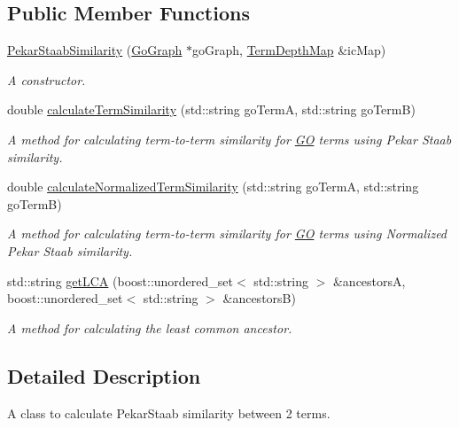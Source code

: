 \subsection*{Public Member Functions}
\begin{DoxyCompactItemize}
\item 
\hyperlink{classPekarStaabSimilarity_a8da126a2d3dc923dd1749e2f395d41cf}{Pekar\+Staab\+Similarity} (\hyperlink{classGoGraph}{Go\+Graph} $\ast$go\+Graph, \hyperlink{classTermDepthMap}{Term\+Depth\+Map} \&ic\+Map)
\begin{DoxyCompactList}\small\item\em A constructor. \end{DoxyCompactList}\item 
double \hyperlink{classPekarStaabSimilarity_a56bb39dcebcf8909f2006d0698f29211}{calculate\+Term\+Similarity} (std\+::string go\+TermA, std\+::string go\+TermB)
\begin{DoxyCompactList}\small\item\em A method for calculating term-\/to-\/term similarity for \hyperlink{namespaceGO}{GO} terms using Pekar Staab similarity. \end{DoxyCompactList}\item 
double \hyperlink{classPekarStaabSimilarity_a2de7c29ad8e24467c6b66862320953a1}{calculate\+Normalized\+Term\+Similarity} (std\+::string go\+TermA, std\+::string go\+TermB)
\begin{DoxyCompactList}\small\item\em A method for calculating term-\/to-\/term similarity for \hyperlink{namespaceGO}{GO} terms using Normalized Pekar Staab similarity. \end{DoxyCompactList}\item 
std\+::string \hyperlink{classPekarStaabSimilarity_aef5d3e6c69bcd7f614092f342ce624c9}{get\+L\+CA} (boost\+::unordered\+\_\+set$<$ std\+::string $>$ \&ancestorsA, boost\+::unordered\+\_\+set$<$ std\+::string $>$ \&ancestorsB)
\begin{DoxyCompactList}\small\item\em A method for calculating the least common ancestor. \end{DoxyCompactList}\end{DoxyCompactItemize}


\subsection{Detailed Description}
A class to calculate Pekar\+Staab similarity between 2 terms. 

